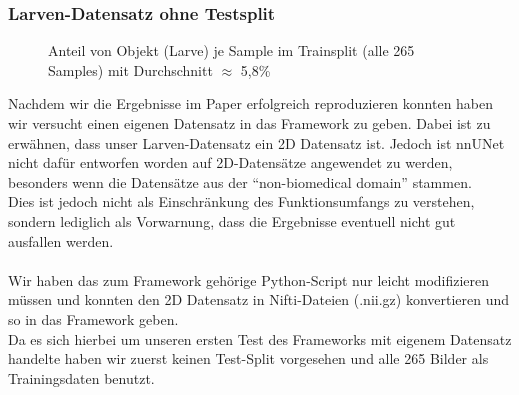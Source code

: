 \subsubsection{Larven-Datensatz ohne Testsplit}
\begin{figure}[H]
\centering

\caption{Anteil von Objekt (Larve) je Sample im Trainsplit (alle 265 Samples) mit Durchschnitt $\approx$ 5,8\%}
\label{pic:Haeuf_200}
\end{figure}
Nachdem wir die Ergebnisse im Paper erfolgreich reproduzieren konnten haben wir versucht einen eigenen Datensatz in das Framework zu geben. Dabei ist zu erwähnen, dass unser Larven-Datensatz \cite{larven} ein 2D Datensatz ist. Jedoch ist nnUNet nicht dafür entworfen worden auf 2D-Datensätze angewendet zu werden, besonders wenn die Datensätze aus der \enquote{non-biomedical domain} \cite{nnunetGithub2D-Daten} stammen.\\
Dies ist jedoch nicht als Einschränkung des Funktionsumfangs zu verstehen, sondern lediglich als Vorwarnung, dass die Ergebnisse eventuell nicht gut ausfallen werden.\\\\
Wir haben das zum Framework gehörige Python-Script \cite{nnunetGithub2D-Pythonscript} nur leicht modifizieren müssen und konnten den 2D Datensatz in Nifti-Dateien (.nii.gz) konvertieren und so in das Framework geben.\\
Da es sich hierbei um unseren ersten Test des Frameworks mit eigenem Datensatz handelte haben wir zuerst keinen Test-Split vorgesehen und alle 265 Bilder als Trainingsdaten benutzt.
